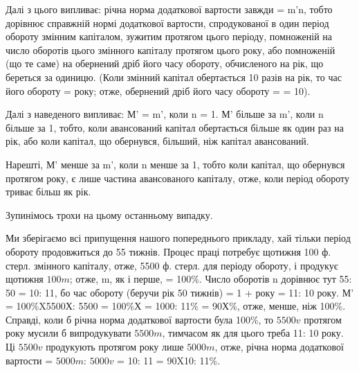 \parcont{}  %
Далі з цього випливає: річна норма додаткової вартости завжди =
m'n, тобто дорівнює справжній нормі додаткової вартости, спродукованої
в один період обороту змінним капіталом, зужитим протягом цього
періоду, помноженій на число оборотів цього змінного капіталу протягом
цього року, або помноженій (що те саме) на обернений дріб його часу
обороту, обчисленого на рік, що береться за одиницю. (Коли
змінний капітал обертається 10 разів на рік, то час його обороту =  року;
отже, обернений дріб його часу обороту =  = 10).

Далі з наведеного випливає: М' = m', коли n = 1. М' більше за m',
коли n більше за 1, тобто, коли авансований капітал обертається більше
як один раз на рік, або коли капітал, що обернувся, більший, ніж капітал
авансований.

Нарешті, М' менше за m', коли n менше за 1, тобто коли капітал,
що обернувся протягом року, є лише частина авансованого капіталу, отже,
коли період обороту триває більш як рік.

Зупинімось трохи на цьому останньому випадку.

Ми зберігаємо всі припущення нашого попереднього прикладу, хай
тільки період обороту продовжиться до 55 тижнів. Процес праці потребує
щотижня 100 ф. стерл. змінного капіталу, отже, 5500 ф. стерл. для періоду
обороту, і продукує щотижня $100 m$; отже, m, як і перше, = 100\%.
Число оборотів n дорівнює тут 55: 50 = 10: 11, бо час обороту (беручи рік
50 тижнів) = 1 +  року = 11: 10 року. М' = 100\%X5500Х: 5500 =
100\%Х = 1000: 11\% = 90Х\%, отже, менше, ніж 100\%. Справді,
коли б річна норма додаткової вартости була 100\%, то $5500 v$ протягом
року мусили б випродукувати $5500 m$, тимчасом як для цього треба 11: 10
року. Ці $5500 v$ продукують протягом року лише $5000 m$, отже, річна
норма додаткової вартости = $5000 m$: $5000 v$ = 10: 11 = 90X10: 11\%.

